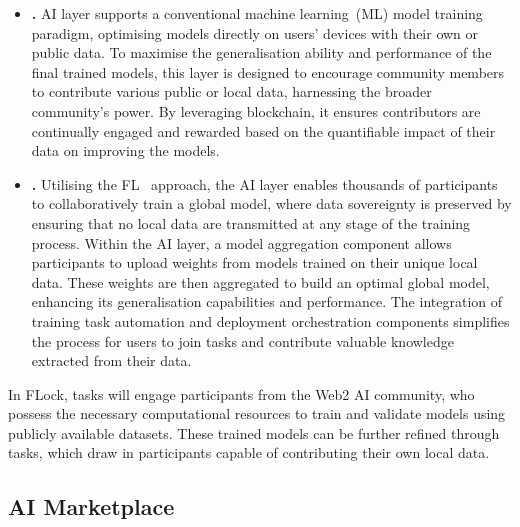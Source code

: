 \documentclass[conference]{IEEEtran}
\begin{document}
\begin{itemize}
    \item {\textbf{\SNT.}} AI layer supports a conventional machine learning~(ML) model training paradigm, optimising models directly on users' devices with their own or public data. To maximise the generalisation ability and performance of the final trained models, this layer is designed to encourage community members to contribute various public or local data, harnessing the broader community's power. By leveraging blockchain, it ensures contributors are continually engaged and rewarded based on the quantifiable impact of their data on improving the models.

 \item  {\textbf{\FL.}} Utilising the FL~\cite{mcmahan2017communication} approach, the AI layer enables thousands of participants to collaboratively train a global model, where data sovereignty is preserved by ensuring that no local data are transmitted at any stage of the training process. Within the AI layer, a model aggregation component allows participants to upload weights from models trained on their unique local data. These weights are then aggregated to build an optimal global model, enhancing its generalisation capabilities and performance. The integration of training task automation and deployment orchestration components simplifies the process for users to join tasks and contribute valuable knowledge extracted from their data.



\end{itemize}

In FLock, \SNT tasks will engage participants from the Web2 AI community, who possess the necessary computational resources to train and validate models using publicly available datasets. These trained models can be further refined through \FL tasks, which draw in participants capable of contributing their own local data.




\subsection{AI Marketplace}
\end{document}

